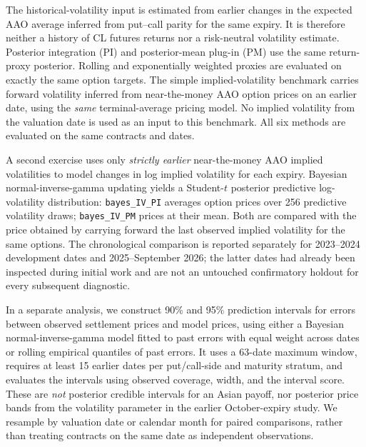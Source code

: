 The historical-volatility input is estimated from earlier changes
in the expected AAO average inferred from put--call parity for
the same expiry. It is therefore neither a history of CL futures
returns nor a risk-neutral volatility estimate. Posterior integration (PI) and
posterior-mean plug-in (PM) use the same return-proxy posterior.
Rolling and exponentially weighted proxies are evaluated on
exactly the same option targets. The simple implied-volatility benchmark carries forward volatility
inferred from near-the-money AAO option prices on an earlier date,
using the \emph{same} terminal-average pricing model. No implied
volatility from the valuation date is used as an input to this
benchmark. All six methods are evaluated on the same contracts
and dates.

A second exercise uses only \emph{strictly earlier} near-the-money
AAO implied volatilities to model changes in log implied
volatility for each expiry. Bayesian normal-inverse-gamma updating yields a
Student-\(t\) posterior predictive log-volatility distribution:
\texttt{bayes\_IV\_PI} averages option prices over 256 predictive
volatility draws; \texttt{bayes\_IV\_PM} prices at their mean.
Both are compared with the price obtained by carrying forward
the last observed implied volatility for the same options. The chronological comparison is reported separately
for 2023--2024 development dates and 2025--September 2026;
the latter dates had already been inspected during initial work and
are not an untouched confirmatory holdout for every subsequent
diagnostic.

In a separate analysis, we construct 90\% and 95\% prediction
intervals for errors between observed settlement prices and model prices,
using either a Bayesian normal-inverse-gamma model fitted to
past errors with equal weight across dates or rolling empirical
quantiles of past errors. It uses a 63-date maximum window, requires
at least 15 earlier dates per put/call-side and maturity stratum,
and evaluates the intervals using observed coverage, width,
and the interval score. These are \emph{not} posterior credible
intervals for an Asian payoff, nor posterior price bands from
the volatility parameter in the earlier October-expiry study.
We resample by valuation date or calendar month for paired
comparisons, rather than treating contracts on the same date
as independent observations.
